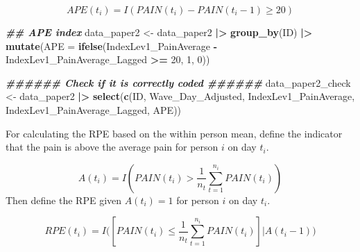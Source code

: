 \documentclass[
  12pt,
]{article}
\newenvironment{Shaded}{\begin{snugshade}}{\end{snugshade}}
\newcommand{\AttributeTok}[1]{\textcolor[rgb]{0.13,0.29,0.53}{#1}}
\newcommand{\DecValTok}[1]{\textcolor[rgb]{0.00,0.00,0.81}{#1}}
\newcommand{\DocumentationTok}[1]{\textcolor[rgb]{0.56,0.35,0.01}{\textbf{\textit{#1}}}}
\newcommand{\FunctionTok}[1]{\textcolor[rgb]{0.13,0.29,0.53}{\textbf{#1}}}
\newcommand{\NormalTok}[1]{#1}
\newcommand{\OtherTok}[1]{\textcolor[rgb]{0.56,0.35,0.01}{#1}}
\newcommand{\SpecialCharTok}[1]{\textcolor[rgb]{0.81,0.36,0.00}{\textbf{#1}}}
\begin{document}
\[
APE(t_i)=I(PAIN(t_i)-PAIN(t_i-1) \geq 20)
\]

\begin{Shaded}
\begin{Highlighting}[]
\DocumentationTok{\#\# APE index}
\NormalTok{data\_paper2 }\OtherTok{\textless{}{-}}\NormalTok{ data\_paper2 }\SpecialCharTok{|\textgreater{}}
  \FunctionTok{group\_by}\NormalTok{(ID) }\SpecialCharTok{|\textgreater{}}
  \FunctionTok{mutate}\NormalTok{(}\AttributeTok{APE =} \FunctionTok{ifelse}\NormalTok{(IndexLev1\_PainAverage }\SpecialCharTok{{-}}\NormalTok{ IndexLev1\_PainAverage\_Lagged }\SpecialCharTok{\textgreater{}=} \DecValTok{20}\NormalTok{, }\DecValTok{1}\NormalTok{, }\DecValTok{0}\NormalTok{))}

\DocumentationTok{\#\#\#\#\#\# Check if it is correctly coded \#\#\#\#\#\#}
\NormalTok{data\_paper2\_check }\OtherTok{\textless{}{-}}\NormalTok{ data\_paper2 }\SpecialCharTok{|\textgreater{}}
  \FunctionTok{select}\NormalTok{(}\FunctionTok{c}\NormalTok{(ID, Wave\_Day\_Adjusted, IndexLev1\_PainAverage, IndexLev1\_PainAverage\_Lagged, APE))}
\end{Highlighting}
\end{Shaded}

For calculating the RPE based on the within person mean, define the
indicator that the pain is above the average pain for person \(i\) on
day \(t_i\).

\[
A(t_i)=I(PAIN(t_i)>\frac{1}{n_t}\sum_{t=1}^{n_i}PAIN(t_i))
\] Then define the RPE given \(A(t_i)=1\) for person \(i\) on day
\(t_i\).

\[
RPE(t_i)=I\Big([PAIN(t_i)\leq \frac{1}{n_t}\sum_{t=1}^{n_i}PAIN(t_i)]|A(t_i-1)\Big)
\]
\end{document}
